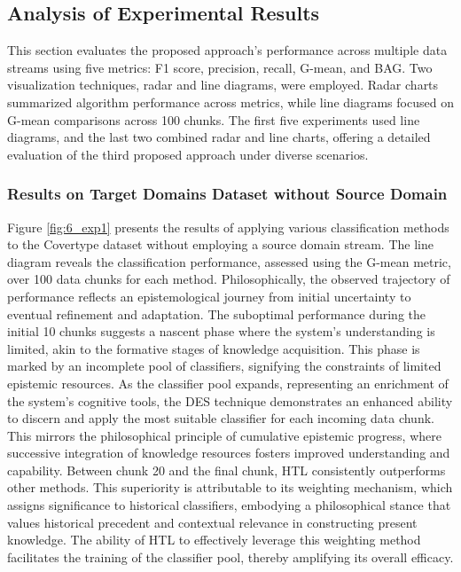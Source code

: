 \subsection{Analysis of Experimental Results}

This section evaluates the proposed approach's performance across multiple data streams using five metrics: F1 score, precision, recall, G-mean, and BAG. Two visualization techniques, radar and line diagrams, were employed. Radar charts summarized algorithm performance across metrics, while line diagrams focused on G-mean comparisons across 100 chunks. The first five experiments used line diagrams, and the last two combined radar and line charts, offering a detailed evaluation of the third proposed approach under diverse scenarios.

\subsubsection{Results on Target Domains Dataset without Source Domain}
Figure \ref{fig:6_exp1} presents the results of applying various classification methods to the Covertype dataset without employing a source domain stream. The line diagram reveals the classification performance, assessed using the G-mean metric, over 100 data chunks for each method. Philosophically, the observed trajectory of performance reflects an epistemological journey from initial uncertainty to eventual refinement and adaptation. The suboptimal performance during the initial 10 chunks suggests a nascent phase where the system's understanding is limited, akin to the formative stages of knowledge acquisition. This phase is marked by an incomplete pool of classifiers, signifying the constraints of limited epistemic resources. As the classifier pool expands, representing an enrichment of the system’s cognitive tools, the DES technique demonstrates an enhanced ability to discern and apply the most suitable classifier for each incoming data chunk. This mirrors the philosophical principle of cumulative epistemic progress, where successive integration of knowledge resources fosters improved understanding and capability. Between chunk 20 and the final chunk, HTL consistently outperforms other methods. This superiority is attributable to its weighting mechanism, which assigns significance to historical classifiers, embodying a philosophical stance that values historical precedent and contextual relevance in constructing present knowledge. The ability of HTL to effectively leverage this weighting method facilitates the training of the classifier pool, thereby amplifying its overall efficacy.  
